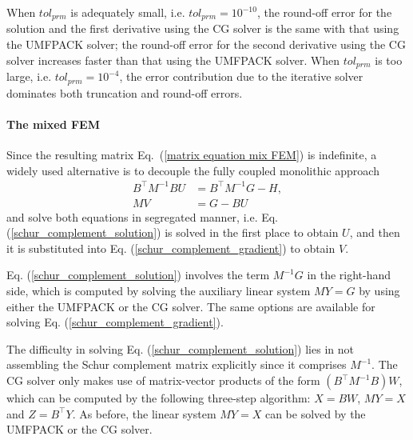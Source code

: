 \documentclass[review,3p]{elsarticle}
\begin{document}
When $tol_{prm}$ is adequately small, i.e. $tol_{prm}=10^{-10}$, the round-off error for the solution and the first derivative using the CG solver is the same with that using the UMFPACK solver; the round-off error for the second derivative using the CG solver increases faster than that using the UMFPACK solver.
When $tol_{prm}$ is too large, i.e. $tol_{prm}=10^{-4}$, the error contribution due to the iterative solver dominates both truncation and round-off errors. 

\paragraph{The mixed FEM}

Since the resulting matrix Eq.~(\ref{matrix equation mix FEM}) is indefinite, a widely used alternative is to decouple the fully coupled monolithic approach
\begin{subequations}
 \begin{align}
  B^{\top} M^{-1} B U &= B^{\top} M^{-1} G - H, 	\label{schur_complement_solution} \\
  MV&=G-BU						\label{schur_complement_gradient}
\end{align}						\label{schur_complement_solu_grad}%
\end{subequations}
and solve both equations in segregated manner, i.e. Eq. (\ref{schur_complement_solution}) is solved in the first place to obtain $U$, and then it is substituted into Eq. (\ref{schur_complement_gradient}) to obtain $V$.

Eq. (\ref{schur_complement_solution}) involves the term $M^{-1} G$ in the right-hand side, which is computed by solving the auxiliary linear system $MY=G$ by using either the UMFPACK or the CG solver. The same options are available for solving Eq. (\ref{schur_complement_gradient}). 

The difficulty in solving Eq. (\ref{schur_complement_solution}) lies in not assembling the Schur complement matrix explicitly since it comprises $M^{-1}$. 
The CG solver only makes use of matrix-vector products of the form $(B^{\top}M^{-1}B)W$, which can be computed by the following three-step algorithm: $X=BW$, $MY=X$ and $Z=B^{\top}Y$. As before, the linear system $MY=X$ can be solved by the UMFPACK or the CG solver.
 
\end{document}
